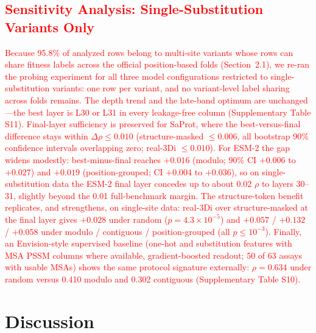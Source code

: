 \documentclass[11pt,a4paper]{article}
\newcommand{\rev}[1]{\textcolor{red}{#1}}
\begin{document}
\textcolor{red}{\subsection{\rev{Sensitivity Analysis: Single-Substitution Variants Only}}
\label{sec:single_site}}

\textcolor{red}{\rev{Because 95.8\% of analyzed rows belong to multi-site variants whose
rows can share fitness labels across the official position-based folds
(Section~2.1), we re-ran the probing experiment for all three model
configurations restricted to single-substitution variants: one row per
variant, and no variant-level label sharing across folds remains. The
depth trend and the late-band optimum are unchanged---the best layer is
L30 or L31 in every leakage-free column (Supplementary Table S11).
Final-layer sufficiency is preserved for SaProt, where the
best-versus-final difference stays within $\Delta\rho \leq 0.010$
(structure-masked $\leq 0.006$, all bootstrap 90\% confidence intervals
overlapping zero; real-3Di $\leq 0.010$). For ESM-2 the gap widens
modestly: best-minus-final reaches $+0.016$ (modulo; 90\% CI $+0.006$ to
$+0.027$) and $+0.019$ (position-grouped; CI $+0.004$ to $+0.036$), so
on single-substitution data the ESM-2 final layer concedes up to about
$0.02$ $\rho$ to layers 30--31, slightly beyond the 0.01 full-benchmark
margin. The structure-token benefit replicates, and strengthens, on
single-site data: real-3Di over structure-masked at the final layer
gives $+0.028$ under random ($p = 4.3 \times 10^{-5}$) and $+0.057$ /
$+0.132$ / $+0.058$ under modulo / contiguous / position-grouped (all
$p \leq 10^{-3}$). Finally, an Envision-style supervised baseline
(one-hot and substitution features with MSA PSSM columns where
available, gradient-boosted readout; 50 of 63 assays with usable MSAs)
shows the same protocol signature externally: $\rho = 0.634$ under
random versus 0.410 modulo and 0.302 contiguous
(Supplementary Table S10).}}

\section{Discussion}
\end{document}
